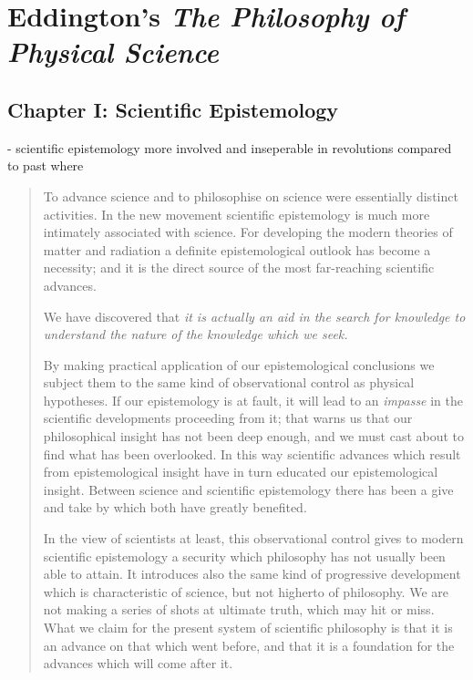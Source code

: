 
\section{Eddington's \emph{The Philosophy of Physical Science}}

\subsection{Chapter I: Scientific Epistemology}

- scientific epistemology more involved and inseperable in revolutions compared to past where 

\begin{quote}
    To advance science and to philosophise on science were essentially distinct activities. In the new movement scientific epistemology is much more intimately associated with science.  For developing the modern theories of matter and radiation a definite epistemological outlook has become a necessity; and it is the direct source of the most far-reaching scientific advances.
    
    We have discovered that \emph{it is actually an aid in the search for knowledge to understand the nature of the knowledge which we seek.}
    
    By making practical application of our epistemological conclusions we subject them to the same kind of observational control as physical hypotheses.  If our epistemology is at fault, it will lead to an \emph{impasse} in the scientific developments proceeding from it; that warns us that our philosophical insight has not been deep enough, and we must cast about to find what has been overlooked.  In this way scientific advances which result from epistemological insight have in turn educated our epistemological insight.  Between science and scientific epistemology there has been a give and take by which both have greatly benefited.
    
    In the view of scientists at least, this observational control gives to modern scientific epistemology a security which philosophy has not usually been able to attain.  It introduces also the same kind of progressive development which is characteristic of science, but not higherto of philosophy.  We are not making a series of shots at ultimate truth, which may hit or miss.  What we claim for the present system of scientific philosophy is that it is an advance on that which went before, and that it is a foundation for the advances which will come after it.
    
    \citep[p. 5]{Eddington1939}
\end{quote}

